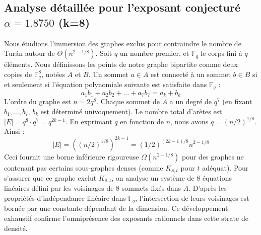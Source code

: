 \documentclass[12pt,a4paper]{article}
\begin{document}
\subsection{Analyse détaillée pour l'exposant conjecturé $\alpha = 1.8750$ (k=8)}
Nous étudions l'immersion des graphes exclus pour contraindre le nombre de Turán autour de $\Theta(n^{2 - 1/8})$.
Soit $q$ un nombre premier, et $\mathbb{F}_q$ le corps fini à $q$ éléments. Nous définissons les points de notre graphe bipartite comme deux copies de $\mathbb{F}_q^{8}$, notées $A$ et $B$.
Un sommet $a \in A$ est connecté à un sommet $b \in B$ si et seulement si l'équation polynomiale suivante est satisfaite dans $\mathbb{F}_q$ :
$$ a_1 b_1 + a_2 b_2 + \dots + a_7 b_7 = a_k + b_k $$
L'ordre du graphe est $n = 2q^8$. Chaque sommet de $A$ a un degré de $q^{7}$ (en fixant $b_1, \dots, b_{7}$, $b_k$ est déterminé univoquement).
Le nombre total d'arêtes est $|E| = q^8 \cdot q^{7} = q^{2k-1}$.
En exprimant $q$ en fonction de $n$, nous avons $q = (n/2)^{1/8}$. Ainsi :
$$ |E| = ( (n/2)^{1/8} )^{2k-1} = (1/2)^{(2k-1)/8} n^{2 - 1/8} $$
Ceci fournit une borne inférieure rigoureuse $\Omega(n^{2 - 1/8})$ pour des graphes ne contenant pas certains sous-graphes denses (comme $K_{8,{t}}$ pour $t$ adéquat).
Pour s'assurer que ce graphe exclut $K_{8,{t}}$, on analyse un système de $8$ équations linéaires défini par les voisinages de $8$ sommets fixés dans $A$.
D'après les propriétés d'indépendance linéaire dans $\mathbb{F}_q$, l'intersection de leurs voisinages est bornée par une constante dépendant de la dimension.
Ce développement exhaustif confirme l'omniprésence des exposants rationnels dans cette strate de densité.
\vspace{1cm}
\end{document}
